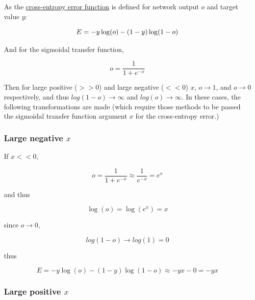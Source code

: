 \documentclass{report}
\begin{document}
As the \hyperref[xentropyfunk]{cross-entropy error function} is
defined for network output $o$ and target value $y$:

\begin{displaymath}\index{Error function!Cross-entropy}
E = - y\log(o)-(1-y)\log(1-o)
\end{displaymath}

And for the sigmoidal transfer function,

\begin{displaymath}
o = \frac{1}{1+e^{-x}}
\end{displaymath}

Then for large positive ($>> 0$) and large negative ($<< 0$) $x$,
$o \rightarrow 1$, and $o \rightarrow 0$ respectively, and thus
$log(1-o) \rightarrow \infty$ and $log(o) \rightarrow \infty$. In
these cases, the following transformations are made (which require
those methods to be passed the sigmoidal transfer function argument
$x$ for the cross-entropy error.)

\subsubsection{Large negative $x$}

If $x << 0$,

\begin{displaymath}
o = \frac{1}{1+e^{-x}} \approx \frac{1}{e^{-x}} = e^x
\end{displaymath}

and thus

\begin{displaymath}
\log(o) = \log(e^x) = x
\end{displaymath}

since $o \rightarrow 0$,

\begin{displaymath}
log(1-o) \rightarrow log(1) = 0
\end{displaymath}

thus

\begin{displaymath}
E = - y\log(o)-(1-y)\log(1-o) \approx -yx - 0 = -yx
\end{displaymath}

\subsubsection{Large positive $x$}
\end{document}
